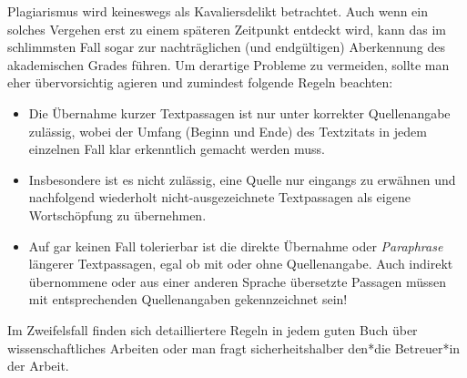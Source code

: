 Plagiarismus wird keineswegs als Kavaliersdelikt betrachtet. Auch wenn ein solches
Vergehen erst zu einem späteren Zeitpunkt entdeckt wird, kann das im schlimmsten
Fall sogar zur nachträglichen (und endgültigen) Aberkennung des akademischen
Grades führen. Um derartige Probleme zu vermeiden, sollte man eher übervorsichtig
agieren und zumindest folgende Regeln beachten:
%
\begin{itemize}
    \item
    Die Übernahme kurzer Textpassagen ist nur unter korrekter Quellenangabe
    zulässig, wobei der Umfang (Beginn und Ende) des Textzitats in jedem
    einzelnen Fall klar erkenntlich gemacht werden muss.
    \item
    Insbesondere ist es nicht zulässig, eine Quelle nur eingangs zu erwähnen
    und nachfolgend wiederholt nicht-ausgezeichnete Textpassagen als eigene
    Wortschöpfung zu übernehmen.
    \item
    Auf gar keinen Fall tolerierbar ist die direkte Übernahme oder
    \emph{Paraphrase} längerer Textpassagen, egal ob mit oder ohne
    Quellenangabe. Auch indirekt übernommene oder aus einer anderen Sprache
    übersetzte Passagen müssen mit entsprechenden Quellenangaben
    gekennzeichnet sein!
\end{itemize}
%
Im Zweifelsfall finden sich detailliertere Regeln in jedem guten Buch über
wissenschaftliches Arbeiten oder man fragt sicherheitshalber den*die
Betreuer*in der Arbeit.
